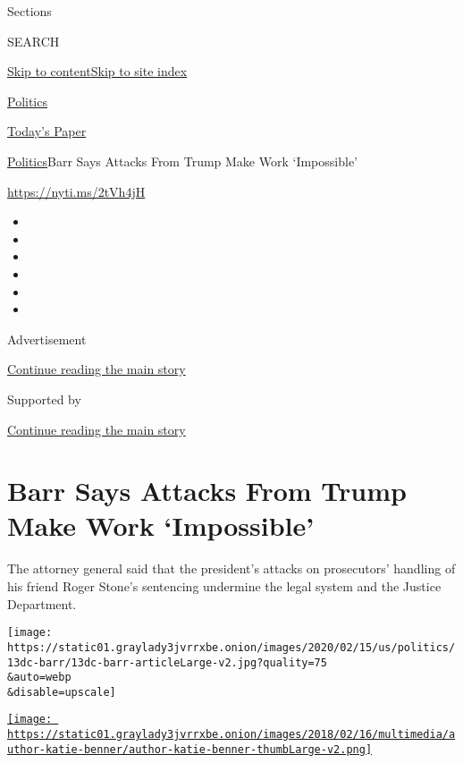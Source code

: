 Sections

SEARCH

\protect\hyperlink{site-content}{Skip to
content}\protect\hyperlink{site-index}{Skip to site index}

\href{https://www.nytimes3xbfgragh.onion/section/politics}{Politics}

\href{https://myaccount.nytimes3xbfgragh.onion/auth/login?response_type=cookie\&client_id=vi}{}

\href{https://www.nytimes3xbfgragh.onion/section/todayspaper}{Today's
Paper}

\href{/section/politics}{Politics}\textbar{}Barr Says Attacks From Trump
Make Work `Impossible'

\url{https://nyti.ms/2tVh4jH}

\begin{itemize}
\item
\item
\item
\item
\item
\item
\end{itemize}

Advertisement

\protect\hyperlink{after-top}{Continue reading the main story}

Supported by

\protect\hyperlink{after-sponsor}{Continue reading the main story}

\hypertarget{barr-says-attacks-from-trump-make-work-impossible}{%
\section{Barr Says Attacks From Trump Make Work
`Impossible'}\label{barr-says-attacks-from-trump-make-work-impossible}}

The attorney general said that the president's attacks on prosecutors'
handling of his friend Roger Stone's sentencing undermine the legal
system and the Justice Department.

\texttt{[image: https://static01.graylady3jvrrxbe.onion/images/2020/02/15/us/politics/13dc-barr/13dc-barr-articleLarge-v2.jpg?quality=75\\\&auto=webp\\\&disable=upscale]}

\href{https://www.nytimes3xbfgragh.onion/by/katie-benner}{\texttt{[image: https://static01.graylady3jvrrxbe.onion/images/2018/02/16/multimedia/author-katie-benner/author-katie-benner-thumbLarge-v2.png]}}

